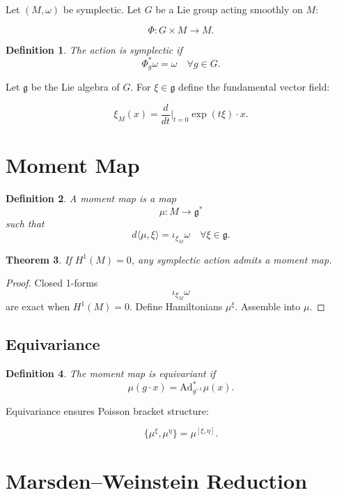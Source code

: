 \documentclass[11pt]{book}
\newtheorem{theorem}{Theorem}[chapter]
\newtheorem{definition}[theorem]{Definition}
\begin{document}
Let $(M,\omega)$ be symplectic.
Let $G$ be a Lie group acting smoothly on $M$:

\[
\Phi: G \times M \to M.
\]

\begin{definition}
The action is symplectic if
\[
\Phi_g^* \omega = \omega
\quad \forall g \in G.
\]
\end{definition}

Let $\mathfrak{g}$ be the Lie algebra of $G$.
For $\xi \in \mathfrak{g}$ define the fundamental vector field:

\[
\xi_M(x) = \frac{d}{dt}\Big|_{t=0}
\exp(t\xi)\cdot x.
\]

\section{Moment Map}

\begin{definition}
A moment map is a map
\[
\mu: M \to \mathfrak{g}^*
\]
such that
\[
d\langle \mu, \xi \rangle = \iota_{\xi_M}\omega
\quad \forall \xi \in \mathfrak{g}.
\]
\end{definition}

\begin{theorem}
If $H^1(M)=0$, any symplectic action
admits a moment map.
\end{theorem}

\begin{proof}
Closed 1-forms
\[
\iota_{\xi_M}\omega
\]
are exact when $H^1(M)=0$.
Define Hamiltonians $\mu^\xi$.
Assemble into $\mu$.
\end{proof}

\subsection{Equivariance}

\begin{definition}
The moment map is equivariant if
\[
\mu(g\cdot x) = \mathrm{Ad}^*_{g^{-1}}\mu(x).
\]
\end{definition}

Equivariance ensures Poisson bracket structure:

\[
\{ \mu^\xi, \mu^\eta \}
=
\mu^{[\xi,\eta]}.
\]

\section{Marsden--Weinstein Reduction}
\end{document}
